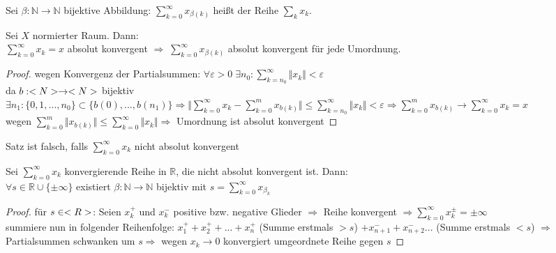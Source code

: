 \begin{*definition}[Umordnung]
	Sei $\beta:\mathbb{N}\rightarrow\mathbb{N}$ bijektive Abbildung: $\sum_{k=0}^\infty x_{\beta(k)}$ heißt  der Reihe $\sum_k x_k$.
\end{*definition}
\begin{proposition}
	Sei $X$ normierter Raum. Dann:\\
	$\sum_{k=0}^\infty x_k = x$ absolut konvergent $\Rightarrow\;\sum_{k=0}^{\infty} x_{\beta(k)}$ absolut konvergent für jede Umordnung.
\end{proposition}
\begin{proof}
	wegen Konvergenz der Partialsummen: $\forall\varepsilon>0\;\exists n_0:\sum_{k=n_0}^{\infty} \Vert x_k\Vert<\varepsilon$ \\
	da $b:<N>\to<N>$ bijektiv $\exists n_1:\{0,1,...,n_0\}\subset \{b(0),...,b(n_1)\}\Rightarrow \Vert\sum_{k=0}^{\infty} x_k - \sum_{k=0}^m x_{b(k)}\Vert\le \sum_{k=n_0}^{\infty} \Vert x_k\Vert<\varepsilon\Rightarrow\sum_{k=0}^m x_{b(k)}\to \sum_{k=0}^{\infty} x_k=x$ \\
	wegen $\sum_{k=0}^m \Vert x_{b(k)}\Vert\le \sum_{k=0}^{\infty} \Vert x_k\Vert\Rightarrow$ Umordnung ist absolut konvergent
\end{proof}

\begin{underlinedenvironment}[Hinweis]
	Satz  ist falsch, falls $\sum_{k=0}^{\infty} x_k$ nicht absolut konvergent
\end{underlinedenvironment}

\begin{proposition}
	Sei $\sum_{k=0}^\infty x_k$ konvergierende Reihe in $\mathbb{R}$, die nicht absolut konvergent ist. Dann:\\
	$\forall s\in\mathbb{R}\cup \{\pm\infty\}$ existiert $\beta:\mathbb{N}\rightarrow\mathbb{N}$ bijektiv mit $s=\sum_{k=0}^\infty x_{\beta_k}$
\end{proposition}
\begin{proof}
	für $s\in<R>$: Seien $x^+_k$ und $x^-_k$ positive bzw. negative Glieder $\Rightarrow$ Reihe konvergent $\Rightarrow\sum_{k=0}^{\infty} x^{\pm}_k=\pm\infty$ \\
	summiere nun in folgender Reihenfolge: $x^+_1+x^+_2+...+x^+_n$ (Summe erstmals $>s$) $+x^-_{n+1}+x^-_{n+2}...$ (Summe erstmals $<s$) $\Rightarrow$ Partialsummen schwanken um $s\Rightarrow$ wegen $x_k\to 0$ konvergiert umgeordnete Reihe gegen $s$
\end{proof}

